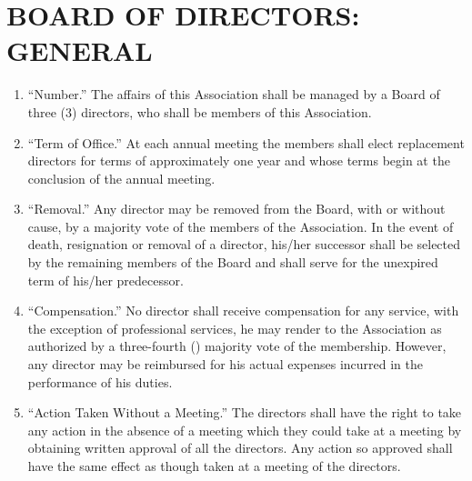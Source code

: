 \documentclass[10pt, letterpaper]{article}
\begin{document}
\section{BOARD OF DIRECTORS: GENERAL}
\begin{enumerate}
  \item ``Number.''
    The affairs of this Association shall be managed by a Board of three (3) directors, who shall be members of this Association.
  \item ``Term of Office.''
    At each annual meeting the members shall elect replacement directors for terms of approximately one year and whose terms begin at the conclusion of the annual meeting.
  \item ``Removal.''
    Any director may be removed from the Board, with or without cause, by a majority vote of the members of the Association.
    In the event of death, resignation or removal of a director, his/her successor shall be selected by the remaining members of the Board and shall serve for the unexpired term of his/her predecessor.
  \item ``Compensation.''
    No director shall receive compensation for any service, with the exception of professional services, he may render to the Association as authorized by a three-fourth (\textthreequarters) majority vote of the membership.
    However, any director may be reimbursed for his actual expenses incurred in the performance of his duties.
  \item ``Action Taken Without a Meeting.''
    The directors shall have the right to take any action in the absence of a meeting which they could take at a meeting by obtaining written approval of all the directors.
    Any action so approved shall have the same effect as though taken at a meeting of the directors.
\end{enumerate}

\end{document}
